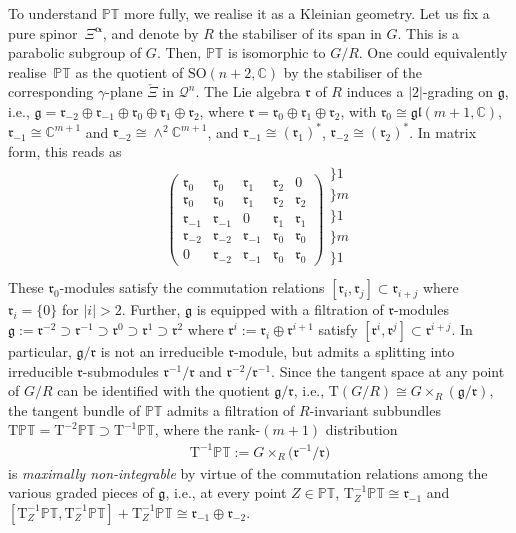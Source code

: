 \documentclass[10pt,a4paper]{amsart}
\numberwithin{equation}{section}
\newcommand{\mc} [1]{\mathcal{#1}}
\newcommand{\SO} {\mathrm{SO}}
\newcommand{\Tgt} {\mathrm{T}}
\newcommand{\glie} {\mathfrak{gl}}
\newcommand{\g} {\mathfrak{g}}
\newcommand{\mfr} {\mathfrak{r}}
\newcommand{\PT} {\mathbb{PT}}
\newcommand{\C} {\mathbb{C}}
\begin{document}
To understand $\PT$ more fully, we realise it as a Kleinian geometry. Let us f\/ix a pure spinor~$\Xi^{\bm{\upalpha}}$, and denote by $R$ the stabiliser of its span in $G$. This is a parabolic subgroup of $G$. Then, $\PT$ is isomorphic to $G/R$. One could equivalently realise~$\PT$ as the quotient of $\SO(n+2,\C)$ by the stabiliser of the corresponding $\gamma$-plane $\check{\Xi}$ in $\mc{Q}^n$. The Lie algebra $\mfr$ of $R$ induces a $|2|$-grading on $\g$, i.e., $\g = \mfr_{-2} \oplus \mfr_{-1} \oplus \mfr_0 \oplus \mfr_1 \oplus \mfr_2$, where $\mfr = \mfr_0 \oplus \mfr_1 \oplus \mfr_2$, with $\mfr_0 \cong \glie(m+1,\C)$, $\mfr_{-1} \cong \C^{m+1}$ and $\mfr_{-2} \cong \wedge^2 \C^{m+1}$, and $\mfr_{-1} \cong (\mfr_1)^*$, $\mfr_{-2} \cong (\mfr_2)^*$. In matrix form, this reads as
\begin{gather*}
\left(
 \begin{array}{c|c|c|c|c}
\mfr_0 & \mfr_0 & \mfr_1 & \mfr_2 & 0 \\\hline 
\mfr_0 & \mfr_0 & \mfr_1 & \mfr_2 & \mfr_2 \\\hline 
\mfr_{-1} & \mfr_{-1} & 0 & \mfr_1 & \mfr_1 \\\hline 
\mfr_{-2} & \mfr_{-2} & \mfr_{-1} & \mfr_0 & \mfr_0 \\\hline 
0 & \mfr_{-2} & \mfr_{-1} & \mfr_0 & \mfr_0
\end{array} \right)
\begin{array}{l}
\} \scriptscriptstyle{1} \\ \} \scriptscriptstyle{m} \\ \} \scriptscriptstyle{1} \\ \} \scriptscriptstyle{m} \\ \} \scriptscriptstyle{1} \\
\end{array}
\end{gather*}
These $\mfr_0$-modules satisfy the commutation relations $[\mfr_i,\mfr_j]\subset \mfr_{i+j}$ where $\mfr_i=\{ 0 \}$ for $|i|>2$. Further, $\g$ is equipped with a f\/iltration of $\mfr$-modules $\g := \mfr^{-2} \supset \mfr^{-1} \supset \mfr^0 \supset \mfr^1 \supset \mfr^2$ where $\mfr^i := \mfr_i \oplus \mfr^{i+1}$ satisfy $[\mfr^i , \mfr^j] \subset \mfr^{i+j}$. In particular, $\g/\mfr$ is not an irreducible $\mfr$-module, but admits a splitting into irreducible $\mfr$-submodules $\mfr^{-1} /\mfr$ and $\mfr^{-2} /\mfr^{-1}$. Since the tangent space at any point of $G/R$ can be identif\/ied with the quotient $\g/\mfr$, i.e., $\Tgt ( G/R ) \cong G \times_R \left( \g/\mfr \right)$, the tangent bundle of $\PT$ admits a f\/iltration of $R$-invariant subbundles $\Tgt \PT = \Tgt^{-2} \PT \supset \Tgt^{-1} \PT$, where the rank-$(m+1)$ distribution
\begin{gather}\label{eq-D}
 \Tgt^{-1} \PT := G \times_R \big( \mfr^{-1}/\mfr \big)
\end{gather}
is \emph{maximally non-integrable} by virtue of the commutation relations among the various graded pieces of $\g$, i.e., at every point $Z \in \PT$, $ \Tgt^{-1}_Z \PT \cong \mfr_{-1}$ and $[ \Tgt^{-1}_Z \PT , \Tgt^{-1}_Z \PT ] + \Tgt^{-1}_Z \PT \cong \mfr_{-1} \oplus \mfr_{-2}$.
\end{document}
